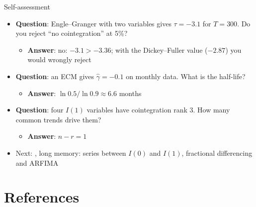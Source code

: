 \begin{frame}{Self-assessment}
\itemsize{\small}
\begin{itemize}
    \item \textbf{Question}: Engle--Granger with two variables gives $\tau = -3.1$ for $T = 300$. Do you reject ``no cointegration'' at 5\%?
    \begin{itemize}
        \item \textbf{Answer}: no: $-3.1 > -3.36$; with the Dickey--Fuller value ($-2.87$) you would wrongly reject
    \end{itemize}
    \item \textbf{Question}: an ECM gives $\hat\gamma = -0.1$ on monthly data. What is the half-life?
    \begin{itemize}
        \item \textbf{Answer}: $\ln 0.5/\ln 0.9 \approx 6.6$ months
    \end{itemize}
    \item \textbf{Question}: four $I(1)$ variables have cointegration rank 3. How many common trends drive them?
    \begin{itemize}
        \item \textbf{Answer}: $n - r = 1$
    \end{itemize}
    \item Next: , long memory: series between $I(0)$ and $I(1)$, fractional differencing and ARFIMA
\end{itemize}
\end{frame}


\section{References}

